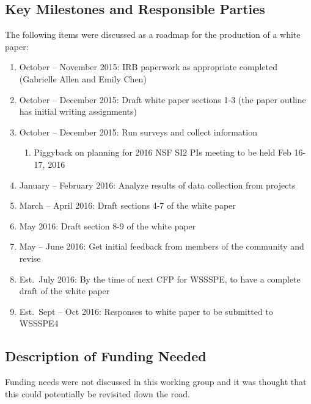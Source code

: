 \subsection{Key Milestones and Responsible Parties}

The following items were discussed as a roadmap for the production of a white
paper:
\begin{enumerate}
\item
October -- November 2015: IRB paperwork as appropriate completed (Gabrielle
Allen and Emily Chen)

\item
October -- December 2015: Draft white paper sections 1-3 (the paper outline has
initial writing assignments)

\item
October -- December 2015: Run surveys and collect information

\begin{enumerate}
\item
Piggyback on planning for 2016 NSF SI2 PIs meeting to be held Feb 16-17, 2016 
       
\end{enumerate}

\item
January -- February 2016: Analyze results of data collection from projects

\item
March -- April 2016: Draft sections 4-7 of the white paper

\item
May 2016: Draft section 8-9 of the white paper

\item
May -- June 2016: Get initial feedback from members of the community and revise

\item
Est.\ July 2016: By the time of next CFP for WSSSPE, to have a complete draft of
the white paper

\item
Est.\ Sept -- Oct 2016: Responses to white paper to be submitted to WSSSPE4

\end{enumerate}


\subsection{Description of Funding Needed}

Funding needs were not discussed in this working group and it was thought that
this could potentially be revisited down the road.



